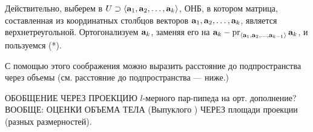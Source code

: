 Действительно, выберем в $U\supset 
\langle \mathbf{a}_1, \mathbf{a}_2, \ldots, \mathbf{a}_k \rangle$, ОНБ,
в котором матрица, составленная из координатных столбцов векторов 
$\mathbf{a}_1, \mathbf{a}_2, \ldots, \mathbf{a}_k$, является верхнетреугольной.
Ортогонализуем $\mathbf{a}_k$, заменяя его на $\mathbf{a}_k - \mathop{\rm pr}\nolimits_{\langle \mathbf{a}_1, \mathbf{a}_2, \ldots, \mathbf{a}_{k-1} \rangle} \mathbf{a}_k$, и пользуемся (*).


С помощью этого соображения можно выразить расстояние до подпространства через 
объемы (см. расстояние до подпространства --- ниже.)


ОБОБЩЕНИЕ ЧЕРЕЗ ПРОЕКЦИЮ $l$-мерного пар-пипеда на орт. дополнение? 
ВООБЩЕ: ОЦЕНКИ ОБЪЕМА ТЕЛА (Выпуклого ) ЧЕРЕЗ площади проекции (разных размерностей).

